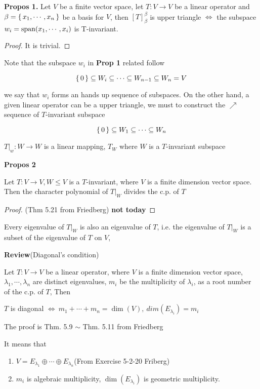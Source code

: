 \textbf{Propos 1.} Let $V$ be a finite vector space, let $T:V \rightarrow V$ be a linear operator and $\beta = \left\{ \,x_1,\cdots,x_n \,\right\}$ be a basis for $V$, then $[T]^{\beta}_{\beta}$ is upper triangle $\Leftrightarrow$ the subspace $w_i = \text{span($x_1,\cdots,x_i$)}$ is T-invariant. 

\begin{proof}
	It is trivial.
\end{proof}

Note that the subspace $w_i$ in \textbf{Prop 1} related follow

$$\left\{ \,0 \,\right\} \subseteq W_i \subseteq \cdots \subseteq W_{n-1} \subseteq W_n = V$$

we say that $w_i$ forms an hands up sequence of subspaces. On the other hand, a given linear operator can be a upper triangle, we must to construct the $\nearrow$ sequence of $T$-invariant subspace

$$\left\{ \,0 \,\right\} \subseteq W_1 \subseteq \cdots \subseteq W_n$$

$T|_{w}:W\rightarrow W$ is a linear mapping, $T_W$ where $W$ is a $T$-invariant subspace 

\textbf{Propos 2}

Let $T:V \rightarrow V, W \leq V$ is a $T$-invariant, where $V$ is a finite dimension vector space. Then the character polynomial of $T|_W$ divides the c.p. of $T$

\begin{proof}(Thm 5.21 from Friedberg)\textbf{\color{red} not today}
	
\end{proof}

\begin{cor*}
	Every eigenvalue of $T|_W$ is also an eigenvalue of $T$, i.e. the eigenvalue of $T|_W$ is a subset of the eigenvalue of $T$ on $V$,
\end{cor*}

\textbf{Review}(Diagonal's condition)

\begin{tcolorbox}
	Let $T:V \rightarrow V$ be a linear operator, where $V$ is a finite dimension vector space, $\lambda_1,\cdots,\lambda_n$ are distinct eigenvalues, $m_i$ be the multiplicity of $\lambda_i$, as a root number of the c.p. of $T$, Then
	
	\begin{center}
		$T$ is diagonal $\Leftrightarrow ~ m_1+\cdots+m_n = \dim(V),~dim(E_{\lambda_i}) = m_i$ 
	\end{center} 
	
	The proof is Thm. 5.9 $\sim$ Thm. 5.11 from Friedberg
	
	It means that 
	
	\begin{enumerate}
		\item $V = E_{\lambda_1} \oplus \cdots \oplus E_{\lambda_n}$(From Exercise 5-2-20 Friberg)
		\item $m_i$ is algebraic multiplicity, $\dim(E_{\lambda_i})$ is geometric multiplicity.
	\end{enumerate}
\end{tcolorbox}

